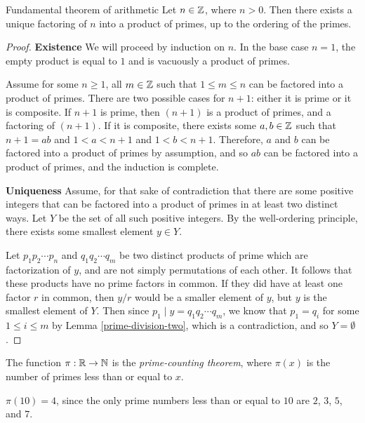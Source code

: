 \begin{thm}\label{fundamental-theorem-arithmetic}Fundamental theorem of arithmetic\proofbreak
    Let $n \in \mathbb{Z}$, where $n > 0$. Then there exists a unique factoring of $n$ into a product of primes, up to the ordering of the primes.
\end{thm}

\begin{proof}\proofbreak
\textbf{Existence} We will proceed by induction on $n$. In the base case $n=1$, the empty product is equal to $1$ and is vacuously a product of primes.

Assume for some $n \geq 1$, all $m \in \mathbb{Z}$ such that $1 \leq m \leq n$ can be factored into a product of primes. There are two possible cases for $n+1$: either it is prime or it is composite. If $n+1$ is prime, then $(n+1)$ is a product of primes, and a factoring of $(n+1)$. If it is composite, there exists some $a, b \in \mathbb{Z}$ such that $n+1 = ab$ and $1 < a < n+1$ and $1 < b < n+1$. Therefore, $a$ and $b$ can be factored into a product of primes by assumption, and so $ab$ can be factored into a product of primes, and the induction is complete.

\textbf{Uniqueness} Assume, for that sake of contradiction that there are some positive integers that can be factored into a product of primes in at least two distinct ways. Let $Y$ be the set of all such positive integers. By the well-ordering principle, there exists some smallest element $y \in Y$.

Let $p_1p_2\cdots p_n$ and $q_1q_2\cdots q_m$ be two distinct products of prime which are factorization of $y$, and are not simply permutations of each other. It follows that these products have no prime factors in common. If they did have at least one factor $r$ in common, then $y/r$ would be a smaller element of $y$, but $y$ is the smallest element of $Y$. Then since $p_1 \mid y = q_1q_2\cdots q_m$, we know that $p_1 = q_i$ for some $1 \leq i \leq m$ by Lemma \ref{prime-division-two}, which is a contradiction, and so $Y = \emptyset$.
\end{proof}

\begin{defn}
    The function $\pi : \mathbb{R} \to \mathbb{N}$ is the \emph{prime-counting theorem}, where $\pi(x)$ is the number of primes less than or equal to $x$.
\end{defn}

\begin{exmp}
    $\pi(10) = 4$, since the only prime numbers less than or equal to $10$ are $2$, $3$, $5$, and $7$.
\end{exmp}

